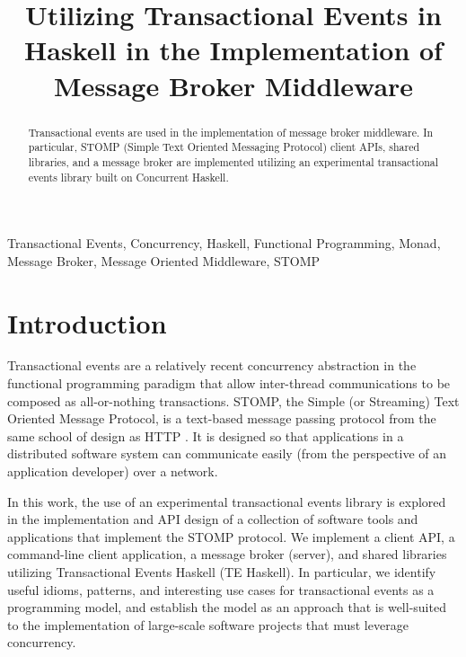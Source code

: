 \documentclass[conference, letterpaper]{IEEEtran}
\begin{document}
\title{Utilizing Transactional Events in Haskell in the Implementation of Message Broker Middleware}

\author{
}


\maketitle

\begin{abstract}
Transactional events are used in the  implementation of message broker middleware. In particular, STOMP 
(Simple Text Oriented Messaging Protocol) client APIs, shared libraries, and a message broker are implemented 
utilizing an experimental transactional events library built on Concurrent Haskell.
\end{abstract}

\begin{IEEEkeywords}
Transactional Events, Concurrency, Haskell, Functional Programming, Monad, Message Broker, 
Message Oriented Middleware, STOMP
\end{IEEEkeywords}

\IEEEpeerreviewmaketitle

\section{Introduction}

Transactional events are a relatively recent concurrency abstraction in the functional programming
paradigm that allow inter-thread communications to be composed as all-or-nothing transactions. STOMP, the Simple (or Streaming) Text Oriented Message Protocol, is a text-based message passing protocol from the same school of design as HTTP \cite{stomp:spec}. It is designed so that applications in a distributed software system can communicate easily (from the perspective of an application developer) over a network. 

In this work, the use of an experimental transactional events library is explored in the implementation and API design of a collection of software tools and applications that implement the STOMP protocol. We implement a client API, a command-line client application, a message broker (server), and shared libraries utilizing 
Transactional Events Haskell (TE Haskell). In particular, we identify useful idioms, patterns,
and interesting use cases for transactional events as a programming model, and establish the model as an approach that is well-suited to the implementation of large-scale software projects that must leverage concurrency.
\end{document}
